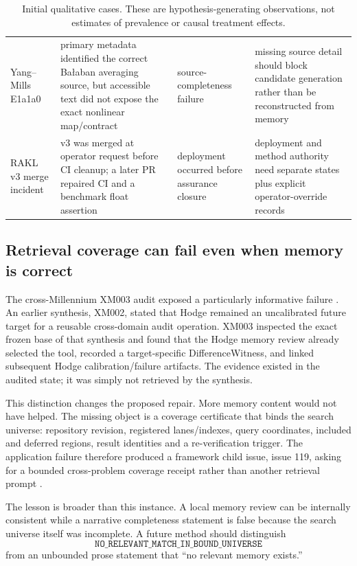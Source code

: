 \begin{table}[ht]
\begin{tabularx}{\textwidth}{p{}p{}Y Y}
Yang--Mills E1a1a0 & primary metadata identified the correct Ba\l aban averaging source, but accessible text did not expose the exact nonlinear map/contract & source-completeness failure & missing source detail should block candidate generation rather than be reconstructed from memory \\
RAKL v3 merge incident & v3 was merged at operator request before CI cleanup; a later PR repaired CI and a benchmark float assertion & deployment occurred before assurance closure & deployment and method authority need separate states plus explicit operator-override records \\
\bottomrule
\end{tabularx}
\caption{Initial qualitative cases. These are hypothesis-generating observations, not estimates of prevalence or causal treatment effects.}
\label{tab:pilot-cases}
\end{table}

\subsection{Retrieval coverage can fail even when memory is correct}

The cross-Millennium XM003 audit exposed a particularly informative failure \cite{raklmath_xm003}. An earlier synthesis, XM002, stated that Hodge remained an uncalibrated future target for a reusable cross-domain audit operation. XM003 inspected the exact frozen base of that synthesis and found that the Hodge memory review already selected the tool, recorded a target-specific DifferenceWitness, and linked subsequent Hodge calibration/failure artifacts. The evidence existed in the audited state; it was simply not retrieved by the synthesis.

This distinction changes the proposed repair. More memory content would not have helped. The missing object is a coverage certificate that binds the search universe: repository revision, registered lanes/indexes, query coordinates, included and deferred regions, result identities and a re-verification trigger. The application failure therefore produced a framework child issue, \RAKL{} issue 119, asking for a bounded cross-problem coverage receipt rather than another retrieval prompt \cite{rakl_issue119}.

The lesson is broader than this instance. A local memory review can be internally consistent while a narrative completeness statement is false because the search universe itself was incomplete. A future \RAKL{} method should distinguish
\[
\texttt{NO\_RELEVANT\_MATCH\_IN\_BOUND\_UNIVERSE}
\]
from an unbounded prose statement that ``no relevant memory exists.''

